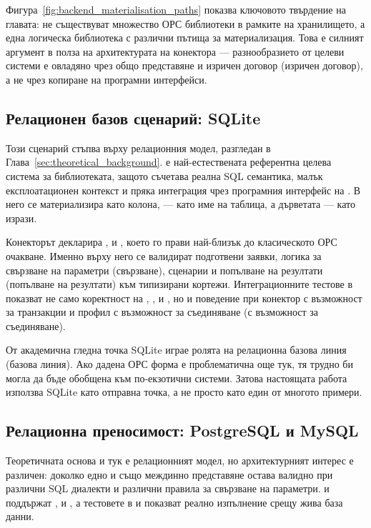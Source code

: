 Фигура~\ref{fig:backend_materialisation_paths} показва ключовото твърдение на главата: не съществуват множество ОРС библиотеки в рамките на хранилището, а една логическа библиотека с различни пътища за материализация. Това е силният аргумент в полза на архитектурата на конектора --- разнообразието от целеви системи е овладяно чрез общо представяне и изричен договор (изричен договор), а не чрез копиране на програмни интерфейси.

\subsection{Релационен базов сценарий: SQLite}

Този сценарий стъпва върху релационния модел, разгледан в Глава~\ref{sec:theoretical_background}.  е най-естествената референтна целева система за библиотеката, защото съчетава реална SQL семантика, малък експлоатационен контекст и пряка интеграция чрез програмния интерфейс на . В него  се материализира като колона,  --- като име на таблица, а дърветата  --- като  изрази.

Конекторът декларира ,  и , което го прави най-близък до класическото ОРС очакване. Именно върху него се валидират подготвени заявки, логика за свързване на параметри (свързване),  сценарии и попълване на резултати (попълване на резултати) към типизирани кортежи. Интеграционните тестове в  показват не само коректност на , ,  и , но и поведение при конектор с възможност за транзакции и профил с възможност за съединяване (с възможност за съединяване).

От академична гледна точка SQLite играе ролята на релационна базова линия (базова линия). Ако дадена ОРС форма е проблематична още тук, тя трудно би могла да бъде обобщена към по-екзотични системи. Затова настоящата работа използва SQLite като отправна точка, а не просто като един от многото примери.

\subsection{Релационна преносимост: PostgreSQL и MySQL}

Теоретичната основа и тук е релационният модел, но архитектурният интерес е различен: доколко едно и също междинно представяне остава валидно при различни SQL диалекти и различни правила за свързване на параметри.  и  поддържат ,  и , а тестовете в  и  показват реално изпълнение срещу жива база данни.

